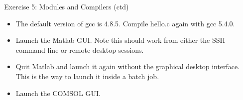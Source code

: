 \documentclass{beamer}
\begin{document}
\begin{frame}{Exercise 5: Modules and Compilers (ctd)}
  \begin{itemize}
  \item{The default version of gcc is 4.8.5. Compile hello.c again with \alert{gcc 5.4.0}.}
\item{Launch the Matlab GUI. Note this should work from either the SSH command-line or remote desktop sessions.}
\item{Quit Matlab and launch it again without the graphical desktop interface. This is the way to launch it inside a batch job.}
\item{Launch the COMSOL GUI.}
\end{itemize}
\end{frame}

\end{document}
